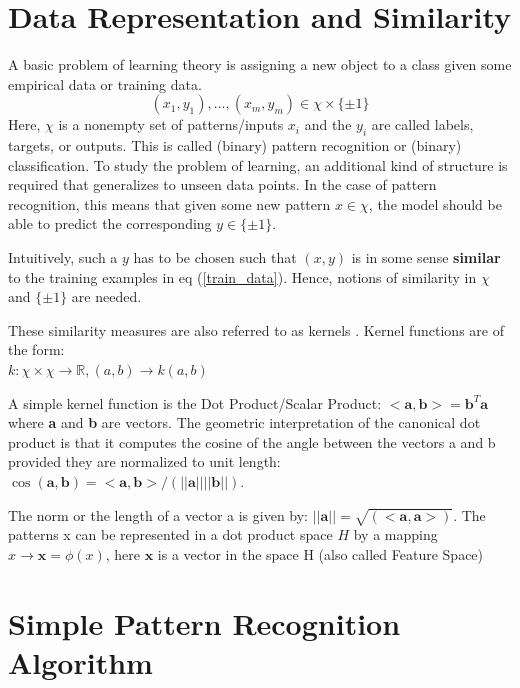 \documentclass{article}
\begin{document}
\section{Data Representation and Similarity}
\label{sec:data_term}
A basic problem of learning theory is assigning a new object to a class given some empirical data or training data.
\begin{equation}
\label{train_data}
  (x_1, y_1), . . . ,(x_m, y_m) \in \chi \times \{\pm 1\}
\end{equation}
Here, $\chi$ is a nonempty set of patterns/inputs $x_i$ and the $y_i$ are called labels, targets, or outputs. This is called (binary) pattern recognition or (binary) classification. To study the problem of learning, an additional kind of structure is required that generalizes to unseen data points. In the case of pattern recognition, this means that given some new pattern $x \in \chi$, the model should be able to predict the corresponding $y \in \{\pm 1\}$.

Intuitively, such a $y$ has to be chosen such that $(x, y)$ is in some sense \textbf{similar} to the training examples in eq  (\ref{train_data}). Hence, notions of similarity in $\chi$ and $\{\pm 1\}$ are needed.

These similarity measures are also referred to as kernels \cite{learn_kernels}. Kernel functions are of the form: \\
$k: \chi \times \chi \rightarrow \mathbb{R}, (a,b) \rightarrow k(a,b)$ 

A simple kernel function is the Dot Product/Scalar Product: $<\textbf{a},\textbf{b}> = \textbf{b}^T\textbf{a}$ where \textbf{a} and \textbf{b} are vectors. The geometric interpretation of the canonical dot product is that it computes the cosine of the angle between the vectors a and b provided they are normalized to unit length: $\cos(\textbf{a},\textbf{b}) = <\textbf{a},\textbf{b}> / (||\textbf{a}|| ||\textbf{b}||)$.

The norm or the length of a vector a is given by: $||\textbf{a}|| = \sqrt{(<\textbf{a},\textbf{a}>)}$. The patterns x can be represented in a dot product space $H$ by a mapping $x \rightarrow \bm{x} = \phi(x)$, here $\bm{x}$ is a vector in the space H (also called Feature Space)

\section{Simple Pattern Recognition Algorithm}
\label{sec:simple_algo}
\end{document}
